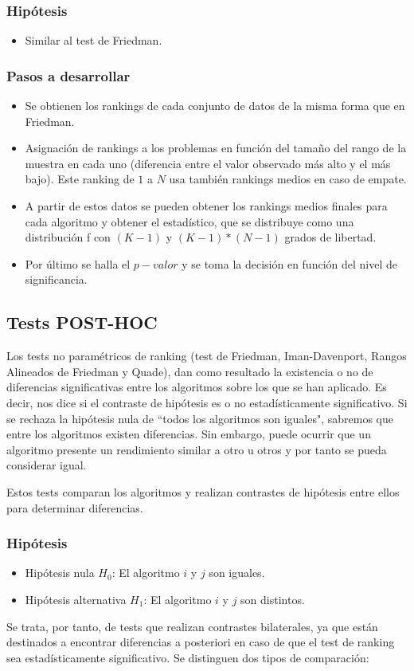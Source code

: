 \subsubsection{Hipótesis}
\begin{itemize}
\item Similar al test de Friedman.
\end{itemize}

\subsubsection{Pasos a desarrollar}
\begin{itemize}
\item Se obtienen los rankings de cada conjunto de datos de la misma forma que en Friedman.
\item Asignación de rankings a los problemas en función del tamaño del rango de la muestra en cada
uno (diferencia entre el valor observado más alto y el más bajo). Este ranking de $1$ a $N$ usa también
rankings medios en caso de empate.
\item A partir de estos datos se pueden obtener los rankings medios finales para cada algoritmo y obtener
el estadístico, que se distribuye como una distribución f con $(K-1)$ y $(K-1)*(N-1)$ grados de libertad.
\item Por último se halla el $p-valor$ y se toma la decisión en función del nivel de significancia.
\end{itemize}


\subsection{Tests POST-HOC}
Los tests no paramétricos de ranking (test de Friedman, Iman-Davenport, Rangos Alineados de Friedman y Quade),
dan como resultado la existencia o no de diferencias significativas entre los algoritmos sobre los que se han
aplicado. Es decir, nos dice si el contraste de hipótesis es o no estadísticamente significativo. Si se rechaza
la hipótesis nula de ``todos los algoritmos son iguales", sabremos que entre los algoritmos existen diferencias.
Sin embargo, puede ocurrir que un algoritmo presente un rendimiento similar a otro u otros y por tanto se pueda
considerar igual.

Estos tests comparan los algoritmos y realizan contrastes de hipótesis entre ellos para determinar diferencias.

\subsubsection{Hipótesis}
\begin{itemize}
\item Hipótesis nula $H_0$: El algoritmo $i$ y $j$ son iguales.
\item Hipótesis alternativa $H_1$: El algoritmo $i$ y $j$ son distintos.
\end{itemize}
Se trata, por tanto, de tests que realizan contrastes bilaterales, ya que están destinados a encontrar diferencias
a posteriori en caso de que el test de ranking sea estadísticamente significativo. Se distinguen dos tipos de
comparación:


